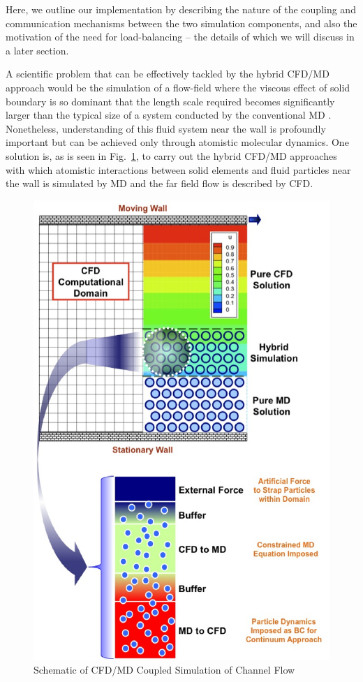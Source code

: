 \documentclass[conference,final]{IEEEtran}
\begin{document}
Here, we outline our implementation by describing the nature of the coupling and communication mechanisms between the two simulation components, and also the motivation of the need for load-balancing -- the details of which we will discuss in a later section.

A scientific problem that can be effectively tackled by the hybrid CFD/MD approach would be the simulation of a flow-field where the viscous effect of solid boundary is so dominant that the length scale required becomes significantly larger than the typical size of a system conducted by the conventional MD . Nonetheless, understanding of this fluid system near the wall is profoundly important but can be achieved only through atomistic molecular dynamics.   One solution is, as is seen in Fig.~\ref{Fig:Couette}, to carry out the hybrid CFD/MD approaches with which atomistic interactions between solid elements and fluid particles near the wall is simulated by MD and the far field flow is described by CFD. 

\begin{figure}
\centering
\includegraphics[scale=0.45]{fig1.eps}
\caption{\small Schematic of CFD/MD Coupled Simulation of Channel Flow}
\label{Fig:Couette}
\end{figure}
\end{document}
